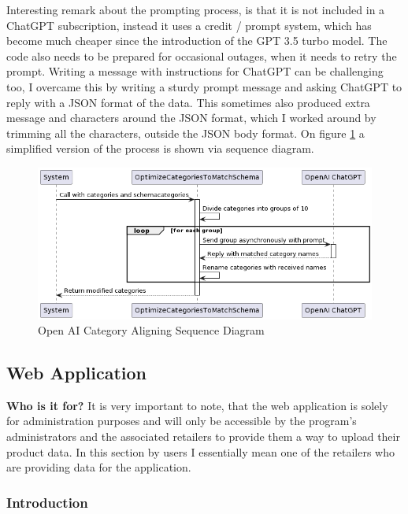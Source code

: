 Interesting remark about the prompting process, is that it is not included in a ChatGPT subscription, instead it uses a credit / prompt system, which has become much cheaper since the introduction of the GPT 3.5 turbo model. The code also needs to be prepared for occasional outages, when it needs to retry the prompt. Writing a message with instructions for ChatGPT can be challenging too, I overcame this by writing a sturdy prompt message and asking ChatGPT to reply with a JSON format of the data. This sometimes also produced extra message and characters around the JSON format, which I worked around by trimming all the characters, outside the JSON body format. On figure \ref{fig:ai} a simplified version of the process is shown via sequence diagram.

\begin{figure}[H]
	\centering
	\includegraphics[width=1\linewidth]{img/openai_sequence.png}
	\caption{Open AI Category Aligning Sequence Diagram}
	\label{fig:ai}
\end{figure}

\pagebreak

\subsection{Web Application}

\noindent\textbf{Who is it for?} It is very important to note, that the web application is solely for administration purposes and will only be accessible by the program's administrators and the associated retailers to provide them a way to upload their product data. In this section by users I essentially mean one of the retailers who are providing data for the application.

\subsubsection{Introduction}

